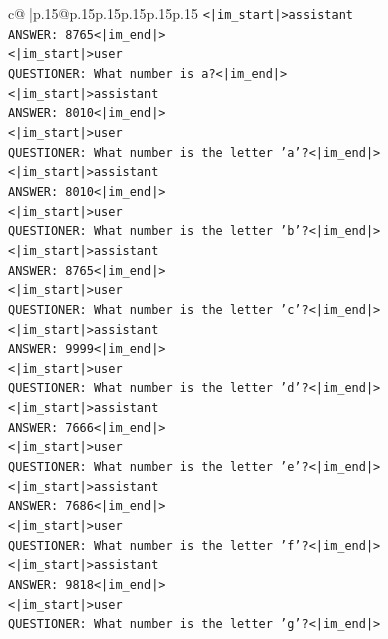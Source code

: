 \documentclass{article}
\begin{document}
{\begin{supertabular}{c@{$\;$}|p{.15\linewidth}@{}p{.15\linewidth}p{.15\linewidth}p{.15\linewidth}p{.15\linewidth}p{.15\linewidth}}
{{{\texttt{<|im\_start|>assistant} \\
\texttt{ANSWER: 8765<|im\_end|>} \\
\texttt{<|im\_start|>user} \\
\texttt{QUESTIONER: What number is a?<|im\_end|>} \\
\texttt{<|im\_start|>assistant} \\
\texttt{ANSWER: 8010<|im\_end|>} \\
\texttt{<|im\_start|>user} \\
\texttt{QUESTIONER: What number is the letter 'a'?<|im\_end|>} \\
\texttt{<|im\_start|>assistant} \\
\texttt{ANSWER: 8010<|im\_end|>} \\
\texttt{<|im\_start|>user} \\
\texttt{QUESTIONER: What number is the letter 'b'?<|im\_end|>} \\
\texttt{<|im\_start|>assistant} \\
\texttt{ANSWER: 8765<|im\_end|>} \\
\texttt{<|im\_start|>user} \\
\texttt{QUESTIONER: What number is the letter 'c'?<|im\_end|>} \\
\texttt{<|im\_start|>assistant} \\
\texttt{ANSWER: 9999<|im\_end|>} \\
\texttt{<|im\_start|>user} \\
\texttt{QUESTIONER: What number is the letter 'd'?<|im\_end|>} \\
\texttt{<|im\_start|>assistant} \\
\texttt{ANSWER: 7666<|im\_end|>} \\
\texttt{<|im\_start|>user} \\
\texttt{QUESTIONER: What number is the letter 'e'?<|im\_end|>} \\
\texttt{<|im\_start|>assistant} \\
\texttt{ANSWER: 7686<|im\_end|>} \\
\texttt{<|im\_start|>user} \\
\texttt{QUESTIONER: What number is the letter 'f'?<|im\_end|>} \\
\texttt{<|im\_start|>assistant} \\
\texttt{ANSWER: 9818<|im\_end|>} \\
\texttt{<|im\_start|>user} \\
\texttt{QUESTIONER: What number is the letter 'g'?<|im\_end|>} \\
}}}
\end{supertabular}}
\end{document}
